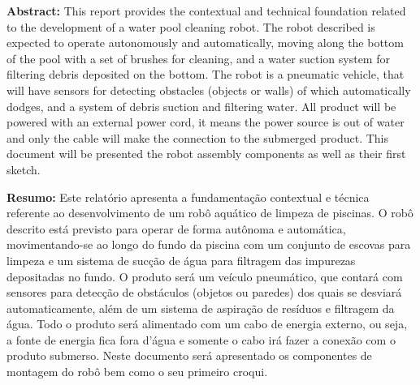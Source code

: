 \begin{abstractenv}
\textbf{Abstract:} This report provides the contextual and technical foundation
related to the development of a water pool cleaning robot. The robot described
is expected to operate autonomously and automatically, moving along the bottom
of the pool with a set of brushes for cleaning, and a water suction system for
filtering debris deposited on the bottom. The robot is a pneumatic vehicle,
that will have sensors for detecting obstacles (objects or walls) of which
automatically dodges, and a system of debris suction and filtering  water. All
product will be powered with an external power cord, it means the power source
is out of water and only the cable will make the connection to the submerged
product. This document will be presented the robot assembly components as well
as their first sketch.
\end{abstractenv}

\begin{abstractenv}
\textbf{Resumo:} Este relatório apresenta a fundamentação contextual e técnica
referente ao desenvolvimento de um robô aquático de limpeza de piscinas. O robô
descrito está previsto para operar de forma autônoma e automática, movimentando-se
ao longo do fundo da piscina com um conjunto de escovas para limpeza e um sistema
de sucção de água para filtragem das impurezas depositadas no fundo. O produto será
um veículo pneumático, que contará com sensores para detecção de obstáculos
(objetos ou paredes) dos quais se desviará automaticamente, além de um sistema de
aspiração de resíduos e filtragem da água. Todo o produto será alimentado com um
cabo de energia externo, ou seja, a fonte de energia fica fora d’água e somente o
cabo irá fazer a conexão com o produto submerso. Neste documento será apresentado
os componentes de montagem do robô bem como o seu primeiro croqui.
\end{abstractenv}